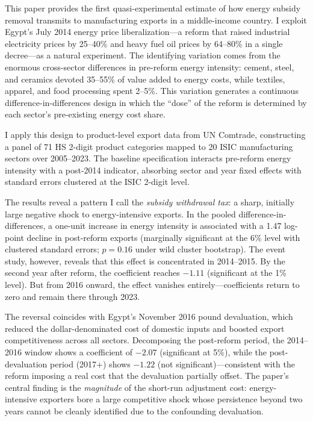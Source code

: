 \documentclass[12pt]{article}
\begin{document}
This paper provides the first quasi-experimental estimate of how energy subsidy removal transmits to manufacturing exports in a middle-income country. I exploit Egypt's July 2014 energy price liberalization---a reform that raised industrial electricity prices by 25--40\% and heavy fuel oil prices by 64--80\% in a single decree---as a natural experiment. The identifying variation comes from the enormous cross-sector differences in pre-reform energy intensity: cement, steel, and ceramics devoted 35--55\% of value added to energy costs, while textiles, apparel, and food processing spent 2--5\%. This variation generates a continuous difference-in-differences design in which the ``dose'' of the reform is determined by each sector's pre-existing energy cost share.

I apply this design to product-level export data from UN Comtrade, constructing a panel of 71 HS 2-digit product categories mapped to 20 ISIC manufacturing sectors over 2005--2023. The baseline specification interacts pre-reform energy intensity with a post-2014 indicator, absorbing sector and year fixed effects with standard errors clustered at the ISIC 2-digit level.

The results reveal a pattern I call the \textit{subsidy withdrawal tax}: a sharp, initially large negative shock to energy-intensive exports. In the pooled difference-in-differences, a one-unit increase in energy intensity is associated with a 1.47 log-point decline in post-reform exports (marginally significant at the 6\% level with clustered standard errors; $p = 0.16$ under wild cluster bootstrap). The event study, however, reveals that this effect is concentrated in 2014--2015. By the second year after reform, the coefficient reaches $-1.11$ (significant at the 1\% level). But from 2016 onward, the effect vanishes entirely---coefficients return to zero and remain there through 2023.

The reversal coincides with Egypt's November 2016 pound devaluation, which reduced the dollar-denominated cost of domestic inputs and boosted export competitiveness across all sectors. Decomposing the post-reform period, the 2014--2016 window shows a coefficient of $-2.07$ (significant at 5\%), while the post-devaluation period (2017+) shows $-1.22$ (not significant)---consistent with the reform imposing a real cost that the devaluation partially offset. The paper's central finding is the \textit{magnitude} of the short-run adjustment cost: energy-intensive exporters bore a large competitive shock whose persistence beyond two years cannot be cleanly identified due to the confounding devaluation.
\end{document}
